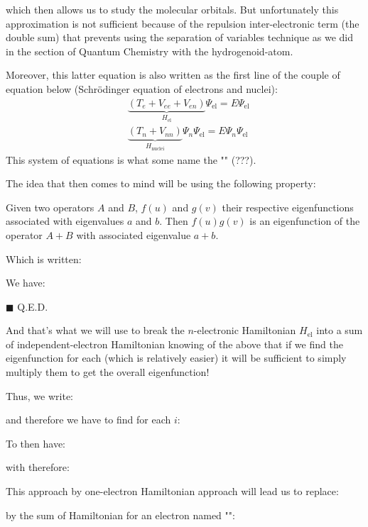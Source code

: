 	which then allows us to study the molecular orbitals. But unfortunately this approximation is not sufficient because of the repulsion inter-electronic term (the double sum) that prevents using the separation of variables technique as we did in the section of Quantum Chemistry with the hydrogenoid-atom.
	
	Moreover, this latter equation is also written as the first line of the couple of equation below (Schrödinger equation of electrons and nuclei):
	\begin{subequations}
		\begin{align}
		&\underbrace{(T_e+V_{ee}+V_{en})}_{H_{\text{el}}}\Psi_{\text{el}}=E\Psi_{\text{el}}\\
		&\underbrace{(T_n+V_{nn})}_{H_{\text{nuclei}}}\Psi_n\Psi_{\text{el}}=E\Psi_n\Psi_{\text{el}}
		\end{align}
	\end{subequations}
	This system of equations is what some name the "" (???).
	
	The idea that then comes to mind will be using the following property:
	
	Given two operators $A$ and $B$, $f (u)$ and $g(v)$ their respective eigenfunctions associated with eigenvalues $a$ and $b$. Then $f (u) g (v)$ is an eigenfunction of the operator $A + B$ with associated eigenvalue $a + b$.

	Which is written:
	
			
	\begin{dem}
		We have:
		
		\begin{flushright}
			$\blacksquare$  Q.E.D.
		\end{flushright}
	\end{dem}
	And that's what we will use to break the $n$-electronic Hamiltonian $H_{\text{el}}$ into a sum of independent-electron Hamiltonian knowing of the above that if we find the eigenfunction for each (which is relatively easier) it will be sufficient to simply multiply them to get the overall eigenfunction!

	Thus, we write:
	
		and therefore we have to find for each $i$:
	
	To then have:
	
	with therefore:
	
	This approach by one-electron Hamiltonian approach will lead us to replace:
	
	by the sum of Hamiltonian for an electron named "":
	
